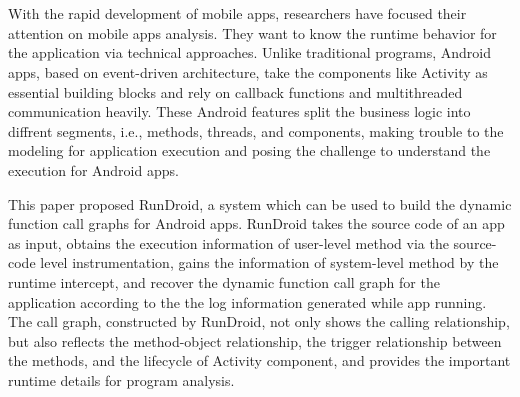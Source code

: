 \newpage

\vspace{-500pt}

\chapter*{}




With the rapid development of mobile apps, researchers have focused their attention on  mobile apps analysis.
They want to know the runtime behavior for the application via technical approaches.
Unlike traditional programs, Android apps, based on  event-driven architecture,  take the components like Activity as  essential building blocks and  rely on callback functions and multithreaded communication heavily.
These Android features split the business logic into diffrent segments, i.e., methods, threads, and components,  making trouble to the modeling for application execution and  posing the challenge to understand the execution for Android apps.





This paper proposed  RunDroid, a system which can be used to build the dynamic function call graphs for Android apps.
RunDroid takes the source code of an app as input, obtains  the execution information of user-level method via  the source-code level instrumentation,
gains the information of system-level method by the runtime intercept, 
and  recover the dynamic function call graph for the application according to the the log information generated while app running.
The call graph, constructed by RunDroid, not only shows the calling relationship, but also reflects the method-object relationship, the trigger relationship between the methods, and the lifecycle of  Activity component, 
and provides the important runtime details for program analysis.



